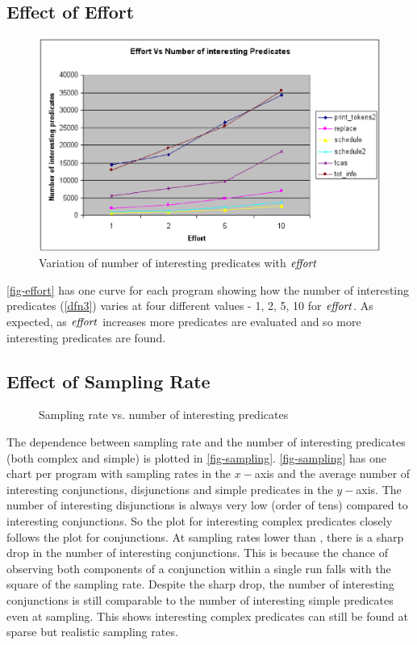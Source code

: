 \subsection{Effect of Effort}

\begin{figure}
  \centering
  \includegraphics{charts/effort}
  \caption{Variation of number of interesting predicates with $\mathit{effort}$}
  \label{fig-effort}
\end{figure}

\autoref{fig-effort} has one curve for each program showing how the number of interesting predicates (\autoref{dfn3}) varies at four different values - 1, 2, 5, 10 for $\mathit{effort}$.  As expected, as $\mathit{effort}$ increases more predicates are evaluated and so more interesting predicates are found.

\subsection{Effect of Sampling Rate}
\label{sec-sampling}

\begin{figure}
  \centering
  \newcommand{\plot}[2]{\subfloat[\prog{#1}]{\texttt{[image: charts/sampling-\#2]}}}
  
  \caption{Sampling rate vs. number of interesting predicates}
  \label{fig-sampling}
\end{figure}

The dependence between sampling rate and the number of interesting predicates (both complex and simple) is plotted in \autoref{fig-sampling}.  \autoref{fig-sampling} has one chart per program with sampling rates in the $x-$axis and the average number of interesting conjunctions, disjunctions and simple predicates in the $y-$axis.  The number of interesting disjunctions is always very low (order of tens) compared to interesting conjunctions.  So the plot for interesting complex predicates closely follows the plot for conjunctions.  At sampling rates lower than , there is a sharp drop in the number of interesting conjunctions.  This is because the chance of observing both components of a conjunction within a single run falls with the square of the sampling rate.  Despite the sharp drop, the number of interesting conjunctions is still comparable to the number of interesting simple predicates even at  sampling.  This shows interesting complex predicates can still be found at sparse but realistic sampling rates.

